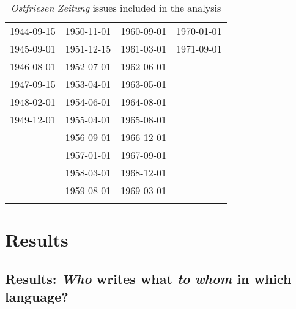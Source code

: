 \documentclass[output=paper]{langsci/langscibook}
\begin{document}
\begin{table} 
\begin{tabularx}{0.85\textwidth}{XXXX}
\lsptoprule
\multicolumn{4}{l}{Volume by date} \\
\hline
1944-09-15 & 1950-11-01 & 1960-09-01 & 1970-01-01\\

1945-09-01 & 1951-12-15 & 1961-03-01 & 1971-09-01\\

1946-08-01 & 1952-07-01 & 1962-06-01 & \\

1947-09-15 & 1953-04-01 & 1963-05-01 & \\

1948-02-01 & 1954-06-01 & 1964-08-01 & \\

1949-12-01 & 1955-04-01 & 1965-08-01 & \\

 & 1956-09-01 & 1966-12-01 & \\

 & 1957-01-01 & 1967-09-01 & \\

 & 1958-03-01 & 1968-12-01 & \\

 & 1959-08-01 & 1969-03-01 & \\
\lspbottomrule
\end{tabularx}
\caption{\textit{Ostfriesen} \textit{Zeitung} issues included in the analysis}
\label{tab:rocker:1}
\end{table}



\section{Results} %
\label{sec:rocker:4}


\subsection{Results: \textit{Who} writes what \textit{to} \textit{whom} in which language?} %
\label{sec:rocker:4.1}
\end{document}
